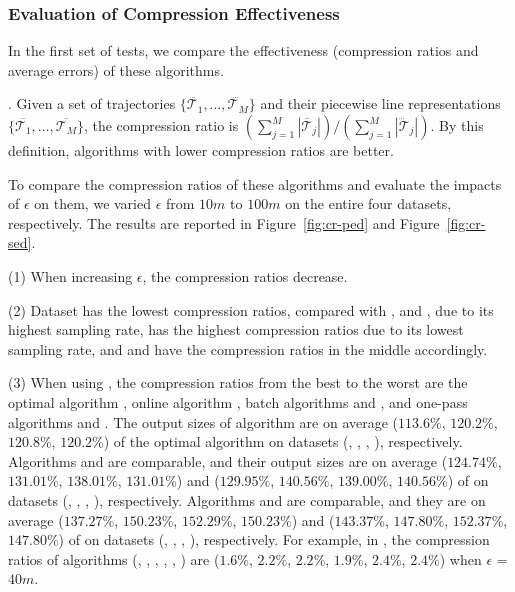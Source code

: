 \subsubsection{Evaluation of Compression Effectiveness}

In the first set of tests, we compare the effectiveness (compression ratios and average errors) of these algorithms.%

. Given a set of trajectories $\{\dddot{\mathcal{T}_1}, \ldots, \dddot{\mathcal{T}_M}\}$ and their piecewise line representations $\{\overline{\mathcal{T}_1}, \ldots, \overline{\mathcal{T}_M}\}$,
the compression ratio is $(\sum_{j=1}^{M} |\overline{\mathcal{T}}_j |)/(\sum_{j=1}^{M} |\dddot{\mathcal{T}}_j |)$.
By this definition, algorithms with lower compression ratios are better.

To compare the compression ratios of these algorithms and evaluate the impacts of $\epsilon$ on them, we varied $\epsilon$ from $10m$ to $100m$ on the entire four datasets, respectively.
The results are reported in Figure~\ref{fig:cr-ped} and Figure~\ref{fig:cr-sed}.


\sstab (1) When increasing $\epsilon$, the compression ratios decrease. 

\sstab (2) Dataset \act has the lowest compression ratios, compared with \ucar, \geolife and \mopsi, due to its highest sampling rate, \ucar has the highest compression ratios due to its lowest sampling rate, and \geolife and \mopsi have the compression ratios in the middle accordingly.

\sstab (3) When using \ped, the compression ratios from the best
to the worst are the optimal algorithm \optp, online algorithm \bqsa, batch algorithms \tpa and
\dpa, and one-pass algorithms \siped and \operb. 
The output sizes of algorithm \bqsa are on average
($113.6\%$, $120.2\%$, $120.8\%$, $120.2\%$) of the optimal algorithm \optp
on datasets (\ucar, \geolife, \mopsi, \act), respectively. 
Algorithms \tpa and \dpa are comparable, and their output sizes are on average
($124.74\%$, $131.01\%$, $138.01\%$, $131.01\%$) and ($129.95\%$, $140.56\%$,
$139.00\%$, $140.56\%$) of \optp
on datasets (\ucar, \geolife, \mopsi, \act), respectively.
Algorithms \siped and \operb are comparable, and they are on average
($137.27\%$, $150.23\%$, $152.29\%$, $150.23\%$)
and ($143.37\%$, $147.80\%$, $152.37\%$, $147.80\%$) of \optp on datasets (\ucar, \geolife, \mopsi, \act), respectively.
%
For example, in \mopsi, the compression ratios of algorithms
(\optp, \tpa, \dpa, \bqsa, \siped, \operb ) are ($1.6\%$, $2.2\%$, $2.2\%$, $1.9\%$, $2.4\%$, $2.4\%$) when $\epsilon$ = $40m$.

